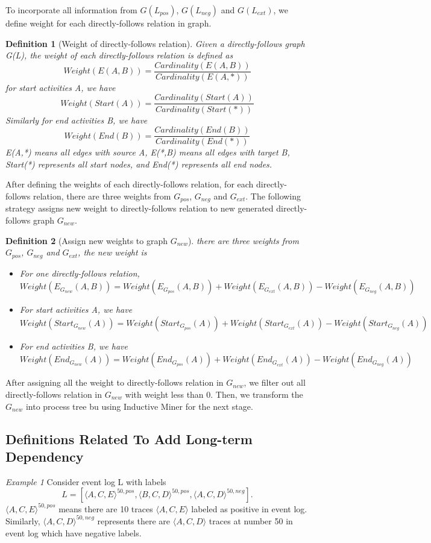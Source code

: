 \documentclass[]{article}
\newtheorem{mydef}{Definition}[section]
\begin{document}
To incorporate all information from  $G(L_{pos})$, $G(L_{neg})$ and $G(L_{ext})$, we define  weight for each directly-follows relation in graph. 
\begin{mydef}[Weight of directly-follows relation]
	Given a directly-follows graph G(L), the weight of each directly-follows relation is defined as \[ Weight(E(A,B)) = \frac{Cardinality(E(A,B))}{Cardinality(E(A,*))}  \] 
	for start activities A, we have 
	\[ Weight(Start(A)) = \frac{Cardinality(Start(A))}{Cardinality(Start(*))} \]
	Similarly for end activities B, we have
	\[ Weight(End(B)) = \frac{Cardinality(End(B))}{Cardinality(End(*))} \]
	E(A,*) means all edges with source A, E(*,B) means all edges with target B, Start(*) represents all start nodes, and End(*) represents all end nodes.
\end{mydef}
After defining the weights of each directly-follows relation, for each directly-follows relation, there are three weights from $G_{pos}$, $G_{neg}$ and $G_{ext}$. The following strategy assigns new weight to directly-follows relation to new generated directly-follows graph $G_{new}$.
\begin{mydef}[Assign new weights to graph $G_{new}$]
	there are three weights from $G_{pos}$, $G_{neg}$ and $G_{ext}$, the new weight is 
	\begin{itemize}
		\item For one directly-follows relation, \[ Weight(E_{G_{new}}(A,B)) = Weight(E_{G_{pos}}(A,B)) + Weight(E_{G_{ext}}(A,B)) - Weight(E_{G_{neg}}(A,B))\]
		\item For start activities A, we have 
		\[ Weight(Start_{G_{new}}(A)) = Weight(Start_{G_{pos}}(A)) + Weight(Start_{G_{ext}}(A)) - Weight(Start_{G_{neg}}(A)) \]
		\item For end activities B, we have
		\[ Weight(End_{G_{new}}(A)) = Weight(End_{G_{pos}}(A)) + Weight(End_{G_{ext}}(A)) - Weight(End_{G_{neg}}(A)) \]
	\end{itemize}
\end{mydef}
After assigning all the weight to directly-follows relation in $G_{new}$, we filter out all directly-follows relation in $G_{new}$ with weight less than 0. 
Then, we transform the $G_{new}$ into process tree bu using Inductive Miner for the next stage.

\subsection{Definitions Related To Add Long-term Dependency}
\textit{Example 1} Consider event log L with labels \[L =[\langle A,C,E \rangle^{50,pos}, \langle B,C,D \rangle^{50,pos}, \langle A,C,D \rangle^{50,neg}]. \] $\langle A,C,E \rangle^{50,pos}$ means there are 10 traces $\langle A,C,E \rangle$ labeled as positive in event log. Similarly, $\langle A,C,D \rangle^{50,neg}$ represents there are $\langle A,C,D \rangle$ traces at number 50 in event log which have negative labels. 
\end{document}
